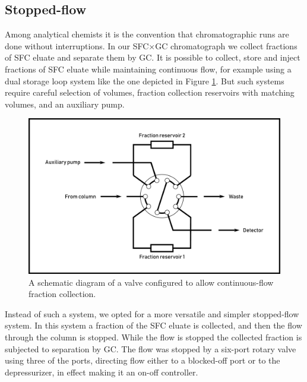 \subsection{Stopped-flow}
\label{sec:stopflow}

Among analytical chemists it is the convention that chromatographic runs are
done without interruptions. In our SFC×GC chromatograph we collect fractions of
SFC eluate and separate them by GC. It is possible to collect, store and inject
fractions of SFC eluate while maintaining continuous flow, for example using a
dual storage loop system like the one depicted in Figure
\ref{fig:continuousflow}. But such systems require careful selection of volumes,
fraction collection reservoirs with matching volumes, and an auxiliary pump.

\begin{figure}
\centering
\includegraphics[width=\textwidth]{Figures/ContinuousFlowStopValve.pdf}
\decoRule

\caption[Schematic diagram of a continuous-flow valve.]{A schematic diagram of a
valve configured to allow continuous-flow fraction collection. }

\label{fig:continuousflow}
\end{figure}

Instead of such a system, we opted for a more versatile and simpler stopped-flow
system. In this system a fraction of the SFC eluate is collected, and then the
flow through the column is stopped. While the flow is stopped the collected
fraction is subjected to separation by GC. The flow was stopped by a six-port
rotary valve using three of the ports, directing flow either to a blocked-off
port or to the depressurizer, in effect making it an on-off controller.

